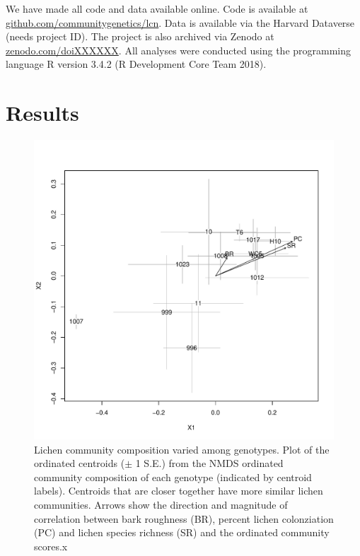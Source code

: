 \documentclass[9pt,twocolumn,twoside,lineno]{pnas-new}
\begin{document}
{We have made all code and data available online. Code is available at
\url{github.com/communitygenetics/lcn}. Data is available via the
Harvard Dataverse (needs project ID). The project is also archived via
Zenodo at \url{zenodo.com/doiXXXXXX}. All analyses were conducted
using the programming language R version 3.4.2 (R Development Core
Team 2018).

\section*{Results}


\begin{figure}[ht]
\centering
\includegraphics[width=\linewidth]{com_chplot_onc.pdf}
\caption{Lichen community composition varied among genotypes. Plot of
  the ordinated centroids ($\pm$ 1 S.E.) from the NMDS ordinated
  community composition of each genotype (indicated by centroid
  labels). Centroids that are closer together have more similar lichen
  communities. Arrows show the direction and magnitude of correlation
  between bark roughness (BR), percent lichen colonziation (PC) and
  lichen species richness (SR) and the ordinated community scores.x}
\label{fig:com_ch_plot}
\end{figure}


}
\end{document}
